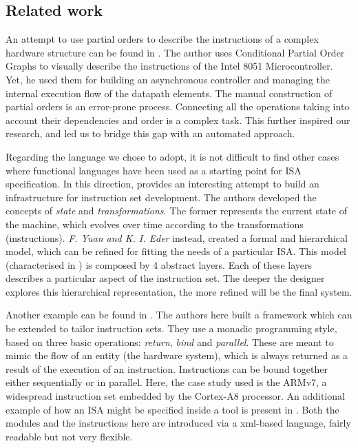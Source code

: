 \documentclass[conference]{IEEEtran}
\begin{document}
\subsection{Related work}

An attempt to use partial orders to describe the instructions of a complex hardware
structure can be found in \cite{maxPhd}. The author uses Conditional Partial Order
Graphs to visually describe the instructions of the Intel 8051 Microcontroller.
Yet, he used them for building an asynchronous controller and managing the internal
execution flow of the datapath elements. The manual construction of partial orders
is an error-prone process. Connecting all the operations taking into account their
dependencies and order is a complex task. This further inspired our research, and
led us to bridge this gap with an automated approach.

Regarding the language we chose to adopt, it is not difficult to find other cases
where functional languages have been used as a starting point for ISA
specification. In this direction, \cite{isaFunc} provides an interesting attempt to
build an infrastructure for instruction set development. The authors developed the
concepts of \textit{state} and \textit{transformations}. The former represents the
current state of the machine, which evolves over time according to the
transformations (instructions). \textit{F. Yuan and K. I. Eder} instead, created a
formal and hierarchical model, which can be refined for fitting the needs of a
particular ISA. This model (characterised in \cite{isaEventB}) is composed by 4
abstract layers. Each of these layers describes a particular aspect of the
instruction set. The deeper the designer explores this hierarchical representation,
the more refined will be the final system.

Another example can be found in \cite{armv7}. The authors here built a framework
which can be extended to tailor instruction sets. They use a monadic programming
style, based on three basic operations: \textit{return}, \textit{bind} and
\textit{parallel}. These are meant to mimic the flow of an entity (the hardware
system), which is always returned as a result of the execution of an instruction.
Instructions can be bound together either sequentially or in parallel. Here, the
case study used is the ARMv7, a widespread instruction set embedded by the 
Cortex-A8 processor. An additional example of how an ISA might be specified inside
a tool is present in \cite{isaXml}. Both the modules and the instructions here are
introduced via a xml-based language, fairly readable but not very flexible.
\end{document}
